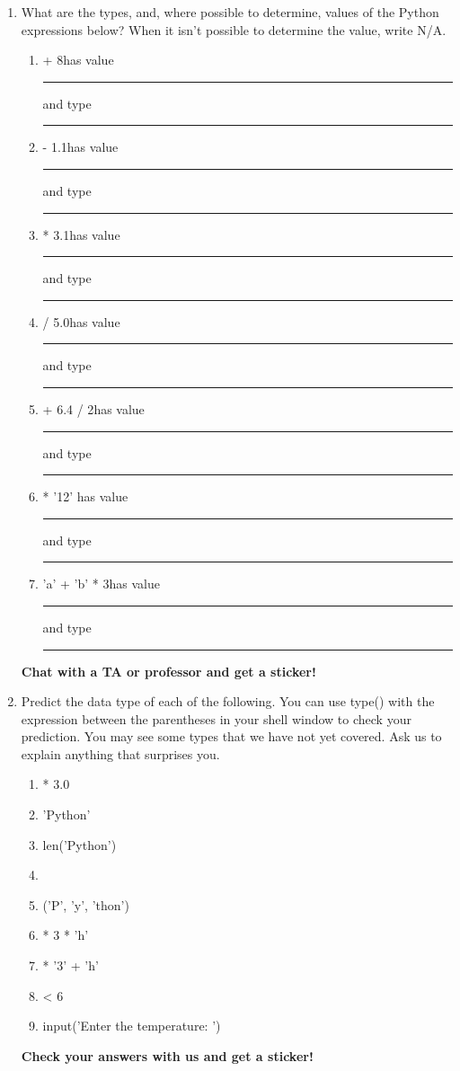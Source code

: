 \documentclass[11pt, letterpaper, onecolumn, oneside, final]{article}
\begin{document}
\begin{enumerate}
\newpage
\item What are the types, and, where possible to determine, values of the Python expressions below? When it isn’t possible to determine the value, write N/A. 
\begin{enumerate}
    \item { + 8}\hfill has value \rule{4cm}{.15mm} and type \rule{4cm}{.15mm}
    \item { - 1.1}\hfill has value \rule{4cm}{.15mm} and type    \rule{4cm}{.15mm}
    \item { * 3.1}\hfill has value \rule{4cm}{.15mm} and type \rule{4cm}{.15mm}
    \item { / 5.0}\hfill has value \rule{4cm}{.15mm} and type \rule{4cm}{.15mm}
    \item { + 6.4 / 2}\hfill has value \rule{4cm}{.15mm} and type \rule{4cm}{.15mm}
    \item { * '12'} \hfill has value \rule{4cm}{.15mm} and type \rule{4cm}{.15mm}
    \item {\consolas 'a' + 'b' * 3}\hfill has value \rule{4cm}{.15mm} and type \rule{4cm}{.15mm}
\end{enumerate}
\textbf{Chat with a TA or professor and get a sticker!}

\item Predict the data type of each of the following. You can use {\consolas type()} with the expression between the parentheses in your shell window to check your prediction. You may see some types that we have not yet covered. Ask us to explain anything that surprises you.
\begin{enumerate}
    \item { * 3.0}
    \item {\consolas 'Python'}
    \item {\consolas len('Python')}
    \item {\consolas ['P', 'y', 't', 'h', 'o', 'n']}
    \item {\consolas ('P', 'y', 'thon')}
    \item { * 3 * 'h'}
    \item { * '3' + 'h'}
    \item { < 6}
    \item {\consolas input('Enter the temperature: ')}
\end{enumerate}
\textbf{Check your answers with us and get a sticker!}




\end{enumerate}
\end{document}

